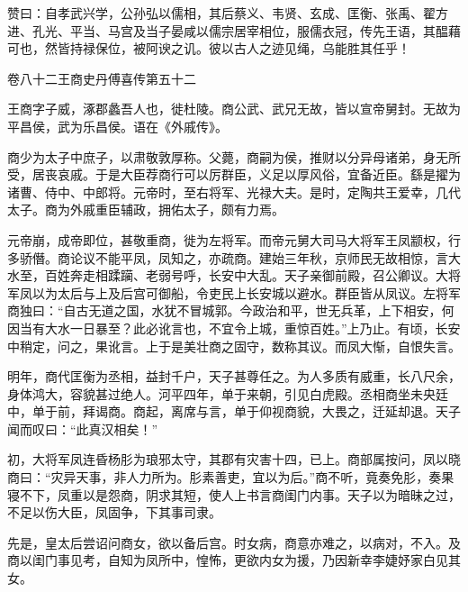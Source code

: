 \documentclass[12pt,UTF8]{ctexbook}
\begin{document}
赞曰：自孝武兴学，公孙弘以儒相，其后蔡义、韦贤、玄成、匡衡、张禹、翟方进、孔光、平当、马宫及当子晏咸以儒宗居宰相位，服儒衣冠，传先王语，其醖藉可也，然皆持禄保位，被阿谀之讥。彼以古人之迹见绳，乌能胜其任乎！





卷八十二王商史丹傅喜传第五十二



王商字子威，涿郡蠡吾人也，徙杜陵。商公武、武兄无故，皆以宣帝舅封。无故为平昌侯，武为乐昌侯。语在《外戚传》。



商少为太子中庶子，以肃敬敦厚称。父薨，商嗣为侯，推财以分异母诸弟，身无所受，居丧哀戚。于是大臣荐商行可以厉群臣，义足以厚风俗，宜备近臣。繇是擢为诸曹、侍中、中郎将。元帝时，至右将军、光禄大夫。是时，定陶共王爱幸，几代太子。商为外戚重臣辅政，拥佑太子，颇有力焉。



元帝崩，成帝即位，甚敬重商，徙为左将军。而帝元舅大司马大将军王凤颛权，行多骄僭。商论议不能平凤，凤知之，亦疏商。建始三年秋，京师民无故相惊，言大水至，百姓奔走相蹂躏、老弱号呼，长安中大乱。天子亲御前殿，召公卿议。大将军凤以为太后与上及后宫可御船，令吏民上长安城以避水。群臣皆从凤议。左将军商独曰：“自古无道之国，水犹不冒城郭。今政治和平，世无兵革，上下相安，何因当有大水一日暴至？此必讹言也，不宜令上城，重惊百姓。”上乃止。有顷，长安中稍定，问之，果讹言。上于是美壮商之固守，数称其议。而凤大惭，自恨失言。



明年，商代匡衡为丞相，益封千户，天子甚尊任之。为人多质有威重，长八尺余，身体鸿大，容貌甚过绝人。河平四年，单于来朝，引见白虎殿。丞相商坐未央廷中，单于前，拜谒商。商起，离席与言，单于仰视商貌，大畏之，迁延却退。天子闻而叹曰：“此真汉相矣！”



初，大将军凤连昏杨肜为琅邪太守，其郡有灾害十四，已上。商部属按问，凤以晓商曰：“灾异天事，非人力所为。肜素善吏，宜以为后。”商不听，竟奏免肜，奏果寝不下，凤重以是怨商，阴求其短，使人上书言商闺门内事。天子以为暗昧之过，不足以伤大臣，凤固争，下其事司隶。



先是，皇太后尝诏问商女，欲以备后宫。时女病，商意亦难之，以病对，不入。及商以闺门事见考，自知为凤所中，惶怖，更欲内女为援，乃因新幸李婕妤家白见其女。
\end{document}
